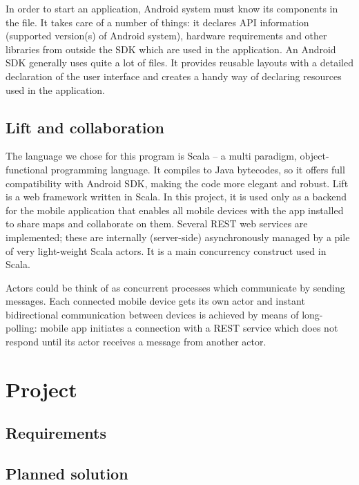 \documentclass[american]{bsc}
\begin{document}
In order to start an application, Android system must know its components in the  file. It takes care of a number of things: it declares API information (supported version(s) of Android system), hardware requirements and other libraries from outside the SDK which are used in the application. An Android SDK generally uses quite a lot of  files. It provides reusable layouts with a detailed declaration of the user interface and creates a handy way of declaring resources used in the application.

\section{Lift and collaboration}
\label{lift}


The language we chose for this program is Scala -- a multi paradigm, object-functional programming language. It compiles to Java bytecodes, so it offers full compatibility with Android SDK, making the code more elegant and robust. Lift is a web framework written in Scala. In this project, it is used only as a backend for the mobile application that enables all mobile devices with the app installed to share maps and collaborate on them. Several REST web services are implemented; these are internally (server-side) asynchronously managed by a pile of very light-weight Scala actors. It is a main concurrency construct used in Scala. 

Actors could be think of as concurrent processes which communicate by sending messages. Each connected mobile device gets its own actor and instant bidirectional communication between devices is achieved by means of long-polling: mobile app initiates a connection with a REST service which does not respond until its actor receives a message from another actor.

\chapter{Project}
\label{chap:project}

\section{Requirements}
\label{sec:requirements}

\section{Planned solution}
\label{sec:plan}
\end{document}
